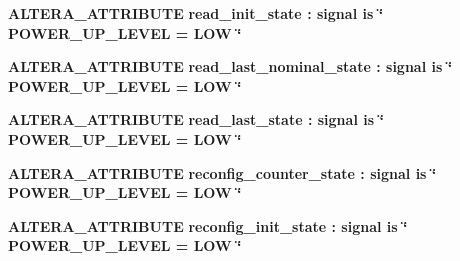 \begin{DoxyCompactItemize}
\item 
{\bf A\+L\+T\+E\+R\+A\+\_\+\+A\+T\+T\+R\+I\+B\+U\+TE} {\bfseries {\bfseries {\bf read\+\_\+init\+\_\+state}} \textcolor{vhdlchar}{ }\textcolor{vhdlchar}{\+:}\textcolor{vhdlchar}{ }\textcolor{keywordflow}{signal}\textcolor{vhdlchar}{ }\textcolor{keywordflow}{is}\textcolor{vhdlchar}{ }\textcolor{vhdlchar}{ }\textcolor{vhdlchar}{ }\textcolor{vhdlchar}{ }\textcolor{keyword}{\char`\"{} P\+O\+W\+E\+R\+\_\+\+U\+P\+\_\+\+L\+E\+V\+E\+L = L\+O\+W \char`\"{}}\textcolor{vhdlchar}{ }} 
\item 
{\bf A\+L\+T\+E\+R\+A\+\_\+\+A\+T\+T\+R\+I\+B\+U\+TE} {\bfseries {\bfseries {\bf read\+\_\+last\+\_\+nominal\+\_\+state}} \textcolor{vhdlchar}{ }\textcolor{vhdlchar}{\+:}\textcolor{vhdlchar}{ }\textcolor{keywordflow}{signal}\textcolor{vhdlchar}{ }\textcolor{keywordflow}{is}\textcolor{vhdlchar}{ }\textcolor{vhdlchar}{ }\textcolor{vhdlchar}{ }\textcolor{vhdlchar}{ }\textcolor{keyword}{\char`\"{} P\+O\+W\+E\+R\+\_\+\+U\+P\+\_\+\+L\+E\+V\+E\+L = L\+O\+W \char`\"{}}\textcolor{vhdlchar}{ }} 
\item 
{\bf A\+L\+T\+E\+R\+A\+\_\+\+A\+T\+T\+R\+I\+B\+U\+TE} {\bfseries {\bfseries {\bf read\+\_\+last\+\_\+state}} \textcolor{vhdlchar}{ }\textcolor{vhdlchar}{\+:}\textcolor{vhdlchar}{ }\textcolor{keywordflow}{signal}\textcolor{vhdlchar}{ }\textcolor{keywordflow}{is}\textcolor{vhdlchar}{ }\textcolor{vhdlchar}{ }\textcolor{vhdlchar}{ }\textcolor{vhdlchar}{ }\textcolor{keyword}{\char`\"{} P\+O\+W\+E\+R\+\_\+\+U\+P\+\_\+\+L\+E\+V\+E\+L = L\+O\+W \char`\"{}}\textcolor{vhdlchar}{ }} 
\item 
{\bf A\+L\+T\+E\+R\+A\+\_\+\+A\+T\+T\+R\+I\+B\+U\+TE} {\bfseries {\bfseries {\bf reconfig\+\_\+counter\+\_\+state}} \textcolor{vhdlchar}{ }\textcolor{vhdlchar}{\+:}\textcolor{vhdlchar}{ }\textcolor{keywordflow}{signal}\textcolor{vhdlchar}{ }\textcolor{keywordflow}{is}\textcolor{vhdlchar}{ }\textcolor{vhdlchar}{ }\textcolor{vhdlchar}{ }\textcolor{vhdlchar}{ }\textcolor{keyword}{\char`\"{} P\+O\+W\+E\+R\+\_\+\+U\+P\+\_\+\+L\+E\+V\+E\+L = L\+O\+W \char`\"{}}\textcolor{vhdlchar}{ }} 
\item 
{\bf A\+L\+T\+E\+R\+A\+\_\+\+A\+T\+T\+R\+I\+B\+U\+TE} {\bfseries {\bfseries {\bf reconfig\+\_\+init\+\_\+state}} \textcolor{vhdlchar}{ }\textcolor{vhdlchar}{\+:}\textcolor{vhdlchar}{ }\textcolor{keywordflow}{signal}\textcolor{vhdlchar}{ }\textcolor{keywordflow}{is}\textcolor{vhdlchar}{ }\textcolor{vhdlchar}{ }\textcolor{vhdlchar}{ }\textcolor{vhdlchar}{ }\textcolor{keyword}{\char`\"{} P\+O\+W\+E\+R\+\_\+\+U\+P\+\_\+\+L\+E\+V\+E\+L = L\+O\+W \char`\"{}}\textcolor{vhdlchar}{ }} 

\end{DoxyCompactItemize}
